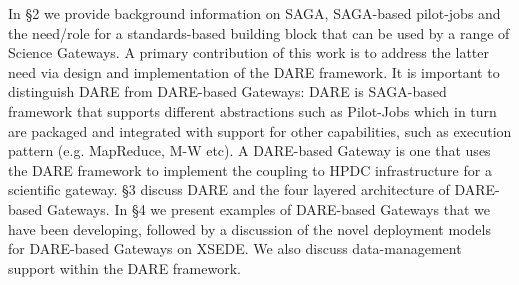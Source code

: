 \documentclass[]{svjour3}
\begin{document}
In \S2 we provide background information on SAGA, SAGA-based
pilot-jobs and the need/role for a standards-based building block that
can be used by a range of Science Gateways.  A primary contribution of
this work is to address the latter need via design and implementation
of the DARE framework.  It is important to distinguish DARE from
DARE-based Gateways: DARE is SAGA-based framework that supports
different abstractions such as Pilot-Jobs which in turn are packaged
and integrated with support for other capabilities, such as execution
pattern (e.g. MapReduce, M-W etc). A DARE-based Gateway is one that
uses the DARE framework to implement the coupling to HPDC
infrastructure for a scientific gateway.  \S3 discuss DARE and the
four layered architecture of DARE-based Gateways. In \S4 we present
examples of DARE-based Gateways that we have been developing, followed
by a discussion of the novel deployment models for DARE-based Gateways
on XSEDE. We also discuss data-management support within the DARE
framework.


\end{document}
